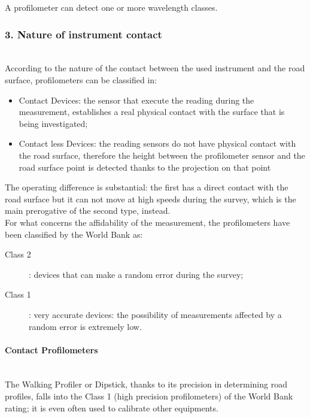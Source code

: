 \documentclass[tesi]{subfiles}
\begin{document}
\noindent A profilometer can detect one or more wavelength classes.

\clearpage
\subsubsection{3. Nature of instrument contact}\label{ssc:Instrument_Contact}\leavevmode\\
According to the nature of the contact between the used instrument and the road surface, profilometers can be classified in:
\begin{itemize}
\item Contact Devices: the sensor that execute the reading during the measurement, establishes a real physical contact with the surface that is being investigated;

\item Contact less Devices: the reading sensors do not have physical contact with the road surface, therefore the height between the profilometer sensor and the road surface point is detected thanks to the projection on that point
\end{itemize}
\noindent The operating difference is substantial: the first has a direct contact with the road surface but it can not move at high speeds during the survey, which is the main prerogative of the second type, instead. \\For what concerns the affidability of the measurement, the profilometers have been classified by the World Bank as:\cite{sayers1995calculation}
\begin{description}

	\item [Class 2]: devices that can make a random error during the survey;
	\item [Class 1]: very accurate devices: the possibility of measurements affected by a random error is extremely low.

\end{description}

\paragraph{Contact Profilometers}\leavevmode\\
The Walking Profiler or Dipstick\cite{little_book}, thanks to its precision in determining road profiles, falls into the Class 1 (high precision profilometers) of the World Bank rating\cite{sayers1995calculation}; it is even often used to calibrate other equipments.
\end{document}
